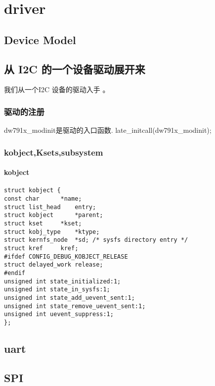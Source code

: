 \part{driver}


\chapter{Device Model}


\chapter{ 从 I2C 的一个设备驱动展开来}


我们从一个I2C 设备的驱动入手 。

\section{驱动的注册}

dw791x\_modinit是驱动的入口函数.
late_initcall(dw791x_modinit);





\section{kobject,Ksets,subsystem}

\subsection{kobject}

\begin{lstlisting}
struct kobject {
const char		*name;
struct list_head	entry;
struct kobject		*parent;
struct kset		*kset;
struct kobj_type	*ktype;
struct kernfs_node	*sd; /* sysfs directory entry */
struct kref		kref;
#ifdef CONFIG_DEBUG_KOBJECT_RELEASE
struct delayed_work	release;
#endif
unsigned int state_initialized:1;
unsigned int state_in_sysfs:1;
unsigned int state_add_uevent_sent:1;
unsigned int state_remove_uevent_sent:1;
unsigned int uevent_suppress:1;
};
\end{lstlisting}








\chapter{uart}


\chapter{SPI}


